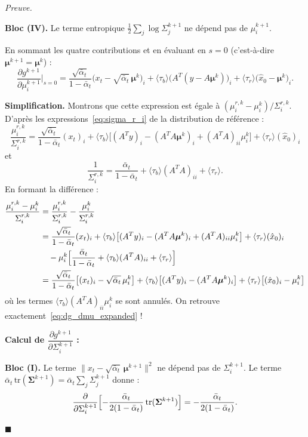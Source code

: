 \documentclass[12pt]{article}
\newcommand{\alt}{\bar\alpha_t}
\renewcommand{\qedsymbol}{$\blacksquare$}
\renewenvironment{proof}[1][\proofname]{%
  \par\medskip\noindent
  \textit{\color{proofgray}#1.}\enspace\ignorespaces
}{\hfill\qedsymbol\par\medskip}
\renewcommand{\proofname}{Preuve}
\begin{document}
\begin{proof}
\textbf{Bloc (IV).} Le terme entropique $\frac{1}{2}\sum_j \log\Sigma_j^{k+1}$ ne dépend pas de $\mu_i^{k+1}$.

\medskip
En sommant les quatre contributions et en évaluant en $s=0$ (c'est-à-dire $\boldsymbol{\mu}^{k+1} = \boldsymbol{\mu}^k$) :
\begin{equation}
\frac{\partial g^{k+1}}{\partial \mu_i^{k+1}}\bigg|_{s=0} = \frac{\sqrt{\alt}}{1-\alt}\bigl(x_t - \sqrt{\alt}\,\boldsymbol{\mu}^k\bigr)_i + \langle\tau_b\rangle\bigl(A^T(y - A\boldsymbol{\mu}^k)\bigr)_i + \langle\tau_r\rangle\bigl(\hat{x}_0 - \boldsymbol{\mu}^k\bigr)_i.
\label{eq:dg_dmu_expanded}
\end{equation}

\textbf{Simplification.} Montrons que cette expression est égale à $(\mu_i^{r,k} - \mu_i^k)/\Sigma_i^{r,k}$. D'après les expressions~\eqref{eq:sigma_r_i} de la distribution de référence :
\[
\frac{\mu_i^{r,k}}{\Sigma_i^{r,k}} = \frac{\sqrt{\alt}}{1-\alt}(x_t)_i + \langle\tau_b\rangle\bigl[(A^Ty)_i - (A^TA\boldsymbol{\mu}^k)_i + (A^TA)_{ii}\mu_i^k\bigr] + \langle\tau_r\rangle(\hat{x}_0)_i
\]
et
\[
\frac{1}{\Sigma_i^{r,k}} = \frac{\alt}{1-\alt} + \langle\tau_b\rangle(A^TA)_{ii} + \langle\tau_r\rangle.
\]
En formant la différence :
\begin{equation*}
\begin{aligned}
\frac{\mu_i^{r,k} - \mu_i^k}{\Sigma_i^{r,k}} &= \frac{\mu_i^{r,k}}{\Sigma_i^{r,k}} - \frac{\mu_i^k}{\Sigma_i^{r,k}}\\
&= \frac{\sqrt{\alt}}{1-\alt}(x_t)_i + \langle\tau_b\rangle\bigl[(A^Ty)_i - (A^TA\boldsymbol{\mu}^k)_i + (A^TA)_{ii}\mu_i^k\bigr] + \langle\tau_r\rangle(\hat{x}_0)_i \\
&\quad - \mu_i^k\Bigl[\frac{\alt}{1-\alt} + \langle\tau_b\rangle(A^TA)_{ii} + \langle\tau_r\rangle\Bigr]\\
&= \frac{\sqrt{\alt}}{1-\alt}\bigl[(x_t)_i - \sqrt{\alt}\,\mu_i^k\bigr] + \langle\tau_b\rangle\bigl[(A^Ty)_i - (A^TA\boldsymbol{\mu}^k)_i\bigr] + \langle\tau_r\rangle\bigl[(\hat{x}_0)_i - \mu_i^k\bigr]
\end{aligned}
\end{equation*}
où les termes $\langle\tau_b\rangle(A^TA)_{ii}\mu_i^k$ se sont annulés. On retrouve exactement~\eqref{eq:dg_dmu_expanded} !

\bigskip

\textbf{Calcul de $\dfrac{\partial g^{k+1}}{\partial \Sigma_i^{k+1}}$ :}

\medskip
\textbf{Bloc (I).} Le terme $\|x_t - \sqrt{\alt}\,\boldsymbol{\mu}^{k+1}\|^2$ ne dépend pas de $\Sigma_i^{k+1}$. Le terme $\alt\,\mathrm{tr}(\boldsymbol{\Sigma}^{k+1}) = \alt\sum_j \Sigma_j^{k+1}$ donne :
\begin{equation*}
\frac{\partial}{\partial \Sigma_i^{k+1}}\Bigl[-\frac{\alt}{2(1-\alt)}\,\mathrm{tr}(\boldsymbol{\Sigma}^{k+1})\Bigr] = -\frac{\alt}{2(1-\alt)}.
\end{equation*}


\end{proof}
\end{document}
